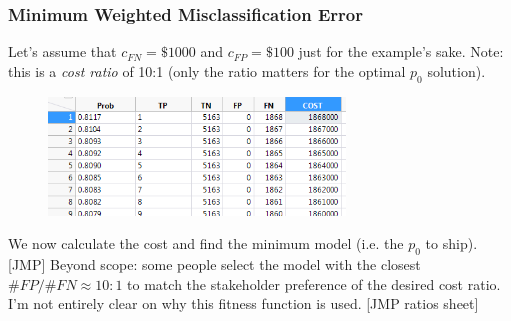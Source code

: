 \documentclass[handout]{beamer}
\begin{document}
\begin{frame}\frametitle{Minimum Weighted Misclassification Error}

Let's assume that $c_{FN} = \$1000$ and $c_{FP} = \$100$ just for the example's sake. Note: this is a \emph{cost ratio} of 10:1 (only the ratio matters for the optimal $p_0$ solution).

\vspace{-0.2cm}
\begin{figure}
\centering
\hspace{-0.5cm}\includegraphics[width=3.1in]{weighted_misclassification_costs.png}
\end{figure}

We now calculate the cost and find the minimum model (i.e. the $p_0$ to ship). [JMP] Beyond scope: some people select the model with the closest $\#FP/\#FN \approx 10:1$ to match the stakeholder preference of the desired cost ratio. I'm not entirely clear on why this fitness function is used. [JMP ratios sheet]



	
\end{frame}
\end{document}
